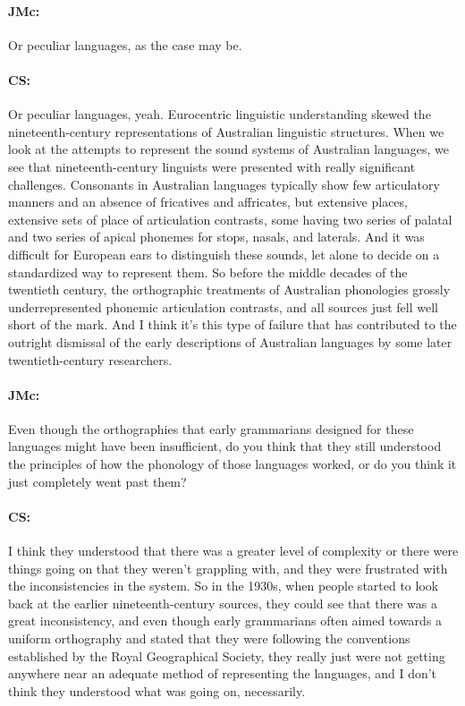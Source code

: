 \documentclass[output=paper]{langscibook}
\begin{document}
\paragraph*{JMc:}  Or peculiar languages, as the case may be.


\paragraph*{CS:}  Or peculiar languages, yeah. Eurocentric linguistic understanding skewed the nineteenth-century representations of Australian linguistic structures. When we look at the attempts to represent the sound systems of Australian languages, we see that nineteenth-century linguists were presented with really significant challenges. Consonants in Australian languages typically show few articulatory manners and an absence of fricatives and affricates, but extensive places, extensive sets of place of articulation contrasts, some having two series of palatal and two series of apical phonemes for stops, nasals, and laterals. And it was difficult for European ears to distinguish these sounds, let alone to decide on a standardized way to represent them. So before the middle decades of the twentieth century, the orthographic treatments of Australian phonologies grossly underrepresented phonemic articulation contrasts, and all sources just fell well short of the mark. And I think it’s this type of failure that has contributed to the outright dismissal of the early descriptions of Australian languages by some later twentieth-century researchers.


\paragraph*{JMc:}  Even though the orthographies that early grammarians designed for these languages might have been insufficient, do you think that they still understood the principles of how the phonology of those languages worked, or do you think it just completely went past them?


\paragraph*{CS:}  I think they understood that there was a greater level of complexity or there were things going on that they weren’t grappling with, and they were frustrated with the inconsistencies in the system. So in the 1930s, when people started to look back at the earlier nineteenth-century sources, they could see that there was a great inconsistency, and even though early grammarians often aimed towards a uniform orthography and stated that they were following the conventions established by the Royal Geographical Society, they really just were not getting anywhere near an adequate method of representing the languages, and I don’t think they understood what was going on, necessarily.
\end{document}
